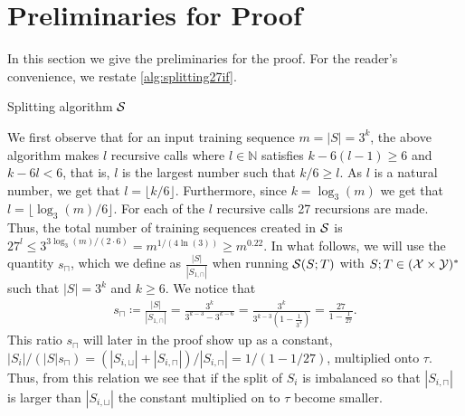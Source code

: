 \section{Preliminaries for Proof}\label{sec:preliminariesproof}
In this section we give the preliminaries for the proof. For the reader's convenience, we restate \cref{alg:splitting27if}.
\setcounter{algocf}{1}
\begin{algorithm}
    \caption{Splitting algorithm $\mathcal{S}$}
\end{algorithm}  

We first observe that for an input training sequence $ m=|S|=3^{k} $,  the above algorithm makes $ l$ recursive calls where $ l\in\mathbb{N} $ satisfies $ k-6(l-1)\geq 6 $ and $ k-6l<6 $, that is, $ l $ is the largest number such that  $ k/6\geq l$. 
As $ l $ is a natural number, we get that $ l=\lfloor k/6\rfloor $. 
Furthermore, since $k=\log_{3}(m)  $ we get that $ l=\lfloor \log_{3}(m)/6\rfloor $. 
For each of the $ l $ recursive calls 27 recursions are made. Thus, the total number of training sequences created in $ \mathcal{S} $ is $ 27^{l}\leq  3^{3\log_{3}(m)/(2\cdot6)}=m^{1/(4\ln(3))}\geq m^{0.22}$.
In what follows, we will use the quantity $ s_{\sqcap}$, which we define as $ \frac{|S|}{|S_{1,\sqcap}|}$ when running $ \mathcal{S}(S;T) $ with $ S;T\in (\mathcal{X}\times \mathcal{Y})^{*} $ such that $ |S|=3^{k} $ and $ k\geq6 $. We notice that  
\begin{align}\label{lem:ratios}
    s_{\sqcap}\coloneqq\frac{|S|}{|S_{1,\sqcap}|}=\frac{3^{k}}{3^{k-3}-3^{k-6}}=\frac{3^{k}}{3^{k-3}(1-\frac{1}{3^{3}})}=\frac{27}{1-\frac{1}{27}}.
\end{align}
This ratio $ s_{\sqcap} $ will later in the proof show up as a constant, $ |S_{i}|/(|S|s_{{\sqcap}})=(|S_{i,\sqcup}|+|S_{i,\sqcap}|)/|S_{i,\sqcap}|=1/(1-1/27) $,  multiplied onto $ \tau.$ Thus, from this relation we see that if the split of $S_{i}$ is imbalanced so that $|S_{i,\sqcap}| $ is larger than $ |S_{i,\sqcup}| $ the constant multiplied on to $ \tau $ become smaller.      

